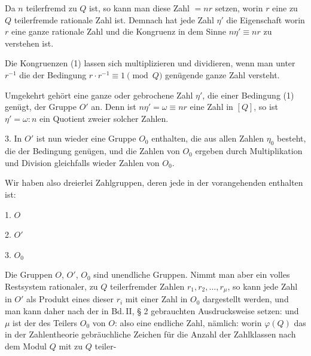 Da $n$ teilerfremd zu $Q$ ist, so kann man diese Zahl $= nr$
setzen, worin $r$ eine zu $Q$ teilerfremde rationale Zahl ist. Demnach hat jede Zahl $\eta'$ die Eigenschaft
worin $r$ eine ganze rationale Zahl und die Kongruenz in dem
Sinne $n\eta' \equiv nr$ zu verstehen ist.

Die Kongruenzen (1) lassen sich multiplizieren und dividieren,
wenn man unter $r^{-1}$ die der Bedingung $r \cdot r^{-1} \equiv 1 \pmod{Q}$
genügende ganze Zahl versteht.

Umgekehrt gehört eine ganze oder gebrochene Zahl $\eta'$, die
einer Bedingung (1) genügt, der Gruppe $O'$ an. Denn ist
$n\eta' = \omega \equiv nr$ eine Zahl in $[Q]$, so ist $\eta' = \omega : n$ ein Quotient
zweier solcher Zahlen.

3. In $O'$ ist nun wieder eine Gruppe $O_0$ enthalten, die aus
allen Zahlen $\eta_0$ besteht, die der Bedingung
genügen, und die Zahlen von $O_0$ ergeben durch Multiplikation
und Division gleichfalls wieder Zahlen von $O_0$.

Wir haben also dreierlei Zahlgruppen, deren jede in der
vorangehenden enthalten ist:

1. $O$ 

2. $O'$ 

3. $O_0$ 

Die Gruppen $O$, $O'$, $O_0$ sind unendliche  Gruppen.
Nimmt man aber ein volles Restsystem rationaler, zu $Q$ teilerfremder
 Zahlen $r_1, r_2, \ldots, r_\mu$, so kann jede Zahl in $O'$ als Produkt
eines dieser $r_i$ mit einer Zahl in $O_0$ dargestellt werden, und man
kann daher nach der in Bd.\,II, § 2 gebrauchten Ausdrucksweise
setzen:
und $\mu$ ist der  des Teilers $O_0$ von $O$: %
also eine endliche Zahl, nämlich:
worin $\varphi(Q)$ das in der Zahlentheorie gebräuchliche Zeichen für
die Anzahl der Zahlklassen nach dem Modul $Q$ mit zu $Q$ teiler-
